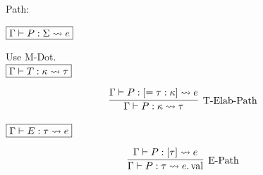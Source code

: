 Path:

$\fbox{$\Gamma \vdash P: \Sigma \rightsquigarrow e$}$

Use M-Dot. \\

$\fbox{$\Gamma \vdash T: \kappa \rightsquigarrow \tau$}$

\begin{gather*}
  \infer[\text{T-Elab-Path}]{\Gamma \vdash P: \kappa \elaborate \tau}{
    \Gamma \vdash P: [= \tau: \kappa] \elaborate e
  }
\end{gather*}

$\fbox{$\Gamma \vdash E: \tau \rightsquigarrow e$}$

\begin{gather*}
  \infer[\text{E-Path}]{\Gamma \vdash P: \tau \elaborate e.\symval}{
    \Gamma \vdash P: [\tau] \elaborate e
  }
\end{gather*}
